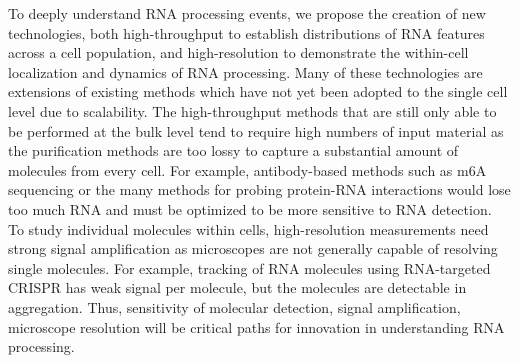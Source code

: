 To deeply understand RNA processing events, we propose the creation of new technologies, both high-throughput to establish distributions of RNA features across a cell population, and high-resolution to demonstrate the within-cell localization and dynamics of RNA processing. Many of these technologies are extensions of existing methods which have not yet been adopted to the single cell level due to scalability. The high-throughput methods that are still only able to be performed at the bulk level tend to require high numbers of input material as the purification methods are too lossy to capture a substantial amount of molecules from every cell. For example, antibody-based methods such as m6A sequencing \cite{Dominissini2012-rc,Dominissini2013-gk,Linder2015-pg} or the many methods for probing protein-RNA interactions \cite{Haberman2017-at,Huppertz2014-jt,Van_Nostrand2016-qd,Zarnegar2016-zq} would lose too much RNA and must be optimized to be more sensitive to RNA detection. To study individual molecules within cells, high-resolution measurements need strong signal amplification as microscopes are not generally capable of resolving single molecules.  For example, tracking of RNA molecules using RNA-targeted CRISPR \cite{Nelles2016-my} has weak signal per molecule, but the molecules are detectable in aggregation. Thus, sensitivity of molecular detection, signal amplification, microscope resolution will be critical paths for innovation in understanding RNA processing.


